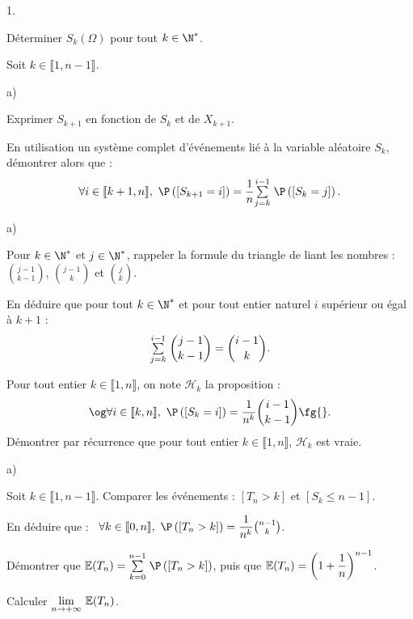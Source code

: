 \documentclass[11pt]{article}%
\begin{document}
{\begin{noliste}{1.}
 \setlength{\itemsep}{4mm}
	\item Déterminer $S_{k}(\Omega)$ pour tout $k\in\N^*$.
	\item Soit $k\in\llbracket1, n-1\rrbracket$.
	\begin{noliste}{a)}
 \setlength{\itemsep}{2mm}
		\item Exprimer $S_{k + 1}$ en fonction de $S_{k}$ et de $X_{k + 1}$.
		\item En utilisation un système complet d'événements lié à la
variable aléatoire $S_{k}$, démontrer alors que :
			\[
\forall i\in\llbracket k + 1, n\rrbracket,~ \P\left(\Ev{S_{k + 1} =
i}\right) = \dfrac1n \Sum{j = k}{i-1} \P\left(\Ev{S_{k} = j}\right).
\]
	\end{noliste}
	\item \begin{noliste}{a)}
 \setlength{\itemsep}{2mm}
		\item Pour $k\in\N^*$ et $j\in\N^*$, rappeler la formule du triangle
de \Scilab{} liant les nombres : $\binom{j-1}{k-1}$, $\binom{j-1}k$ et
$\binom jk$.
		\item En déduire que pour tout $k\in\N^*$ et pour tout entier naturel
$i$ supérieur ou égal à $k + 1$ :
			\[
{\textstyle\sum\limits_{j = k}^{i-1}}\hspace{.1cm} \binom{j-1}{k-1} = \binom{i-1}k.
\]
		\item Pour tout entier $k\in\llbracket1,n\rrbracket$, on note
$\mathcal H_{k}$ la proposition :
		\[
\text\og \forall i\in\llbracket k,n\rrbracket,~ \P\left(\Ev{S_{k} =
i}\right) = \dfrac1{n^{k}}\binom{i-1}{k-1} \text\fg{}.
\]
		Démontrer par récurrence que pour tout entier
$k\in\llbracket1,n\rrbracket$, $\mathcal H_{k}$ est vraie.
	\end{noliste}
	\item \begin{noliste}{a)}
 \setlength{\itemsep}{2mm}
		\item Soit $k\in\llbracket1,n-1\rrbracket$. Comparer les événements :
$[T_{n}>k]$ et $[S_{k} \leq n-1]$.
		\item En déduire que :~ $\forall k\in\llbracket
0,n\rrbracket,~\P\left(\Ev{T_{n}>k}\right) = \dfrac1{n^{k}}
\binom{n-1}k$.
	\end{noliste}
	\item Démontrer que $\E(T_{n}) = \Sum{k = 0}{n-1}
\P\left(\Ev{T_{n}>k}\right)$, puis que $\mathbb{E}(T_{n}) = \left(1 +
\dfrac1n\right)^{n-1}$.
	\item Calculer ${\displaystyle \lim_{n\to + \infty} \ } \mathbb{E}(T_{n})$.
\end{noliste}

}
\end{document}
